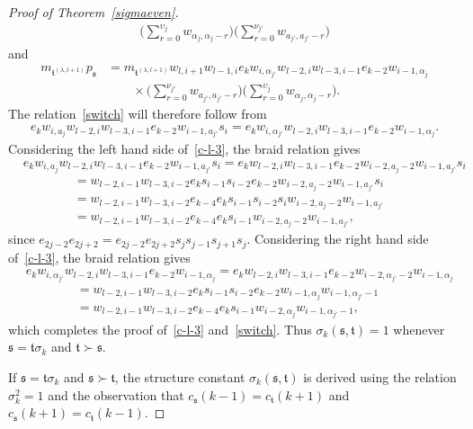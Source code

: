 \documentclass[11pt,a4paper,reqno,svgnames]{amsart}
\theoremstyle{plain}
\theoremstyle{definition}
\numberwithin{equation}{section}
\begin{document}
\begin{proof}[Proof of Theorem~\ref{sigmaeven}]
\begin{equation*}
\begin{split}
\bigg(\sum_{r=0}^{\upsilon_j}w_{\alpha_j,\alpha_j-r}\bigg)
\bigg(\sum_{r=0}^{\nu_{j'}}w_{a_{j'},a_{j'}-r}\bigg)
\end{split}
\end{equation*}
and
\begin{equation*}
\begin{split}
m_{\mathfrak{t}^{(\lambda,l+1)}}p_\mathfrak{s}
&=m_{\mathfrak{t}^{(\lambda,l+1)}} w_{l,i+1}w_{l -1,i}e_{k}w_{i,\alpha_{j'}}
w_{l-2,i}w_{l-3,i-1}e_{k-2}w_{i-1,\alpha_j}\\
&\qquad\times 
\bigg(\sum_{r=0}^{\nu_{j'}}w_{a_{j'},a_{j'}-r}\bigg)
\bigg(\sum_{r=0}^{\upsilon_j}w_{\alpha_j,\alpha_j-r}\bigg). 
\end{split}
\end{equation*}
The relation~\eqref{switch} will therefore follow from 
\begin{align}\label{c-l-3}
e_kw_{i,a_j}w_{l-2,i}w_{l-3,i-1}e_{k-2}w_{i-1,a_{j'}}s_i
=e_{k}w_{i,\alpha_{j'}}w_{l-2,i}w_{l-3,i-1}e_{k-2}w_{i-1,\alpha_j}.
\end{align}
Considering the left hand side of~\eqref{c-l-3}, the braid relation gives
\begin{align*}
&e_{k}w_{i,a_j}w_{l-2,i}w_{l-3,i-1}e_{k-2}w_{i-1,a_{j'}}s_i
=e_{k}w_{l-2,i}w_{l-3,i-1}e_{k-2}w_{i-2,a_j-2}w_{i-1,a_{j'}}s_i\\
&\qquad\qquad=w_{l-2,i-1}w_{l-3,i-2}e_{k}s_{i-1}s_{i-2}e_{k-2}w_{i-2,a_j-2}w_{i-1,a_{j'}}s_i\\
&\qquad\qquad=w_{l-2,i-1}w_{l-3,i-2}e_{k-4}e_{k}s_{i-1}s_{i-2}s_iw_{i-2,a_j-2}w_{i-1,a_{j'}}\\
&\qquad\qquad=w_{l-2,i-1}w_{l-3,i-2}e_{k-4}e_{k}s_{i-1}w_{i-2,a_j-2}w_{i-1,a_{j'}},
\end{align*}
since $e_{2j-2}e_{2j+2}=e_{2j-2}e_{2j+2}s_{j}s_{j-1}s_{j+1}s_{j}$. Considering the right hand side of~\eqref{c-l-3}, the braid relation gives
\begin{align*}
&e_{k}w_{i,\alpha_{j'}}w_{l-2,i}w_{l-3,i-1}e_{k-2}w_{i-1,\alpha_j}
=e_{k}w_{l-2,i}w_{l-3,i-1}e_{k-2}w_{i-2,\alpha_{j'}-2}w_{i-1,\alpha_j}\\
&\qquad\qquad=w_{l-2,i-1}w_{l-3,i-2}e_{k}s_{i-1}s_{i-2}e_{k-2}w_{i-1,\alpha_j}w_{i-1,\alpha_{j'}-1}\\
&\qquad\qquad=w_{l-2,i-1}w_{l-3,i-2}e_{k-4}e_{k}s_{i-1}w_{i-2,\alpha_j}w_{i-1,\alpha_{j'}-1},
\end{align*}
which completes the proof of~\eqref{c-l-3} and~\eqref{switch}. Thus $\sigma_{k}(\mathfrak{s},\mathfrak{t})=1$ whenever $\mathfrak{s}=\mathfrak{t}\sigma_{k}$ and $\mathfrak{t}\succ\mathfrak{s}$.  

If $\mathfrak{s}=\mathfrak{t}\sigma_k$ and $\mathfrak{s}\succ\mathfrak{t}$, the structure constant $\sigma_k(\mathfrak{s,t})$ is derived using the relation $\sigma_k^2=1$ and the observation that $c_\mathfrak{s}(k-1)=c_\mathfrak{t}(k+1)$ and $c_\mathfrak{s}(k+1)=c_\mathfrak{t}(k-1)$. 
\end{proof}
\end{document}
